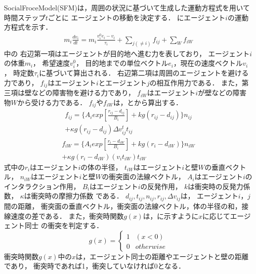 SocialFroceModel(SFM)は，周囲の状況に基づいて生成した運動方程式を用いて時間ステップ$t$ごとに
エージェントの移動を決定する．
にエージェント$i$の運動方程式を示す．
%
\begin{eqnarray}
  m_i \frac{dv_i}{dt} = m_i \frac{v_i^0 e_i - v_i}{\tau_i}
  +\sum_{j(\neq i)}f_{ij}+\sum_{W}f_{iW}
  \label{eq:sfm_siki1}
\end{eqnarray}
%
中の
右辺第一項はエージェントが目的地へ進む力を表しており，
エージェント$i$の体重$m_i$，
希望速度$v_i^0$，
目的地までの単位ベクトル$e_i$，現在の速度ベクトル$v_i$，
時定数$\tau_i$に基づいて算出される．
右辺第二項は周囲のエージェントを避ける力であり，
$f_{ij}$はエージェント$i$とエージェント$j$の相互作用力である．
また，第三項は壁などの障害物を避ける力であり，
$f_{iW}$はエージェント$i$が壁などの障害物$W$から受ける力である．
$f_{ij}$や$f_{iW}$は，とから算出する．
%
\begin{eqnarray}
  f_{ij} =  \{A_i exp [\frac{r_{ij} - d_{ij}}{B_i}  ]
  + kg(r_{ij} - d_{ij})\} n_{ij} \\ \nonumber
  + \kappa g (r_{ij} - d_{ij}) \Delta
  v^t_{ij} t_{ij}
  \label{eq:sfm_siki2}
\end{eqnarray}
%
\begin{eqnarray}
  f_{iW} = \{A_i exp[\frac{r_{i} - d_{iW}}{B_i}]
  + kg(r_{i} - d_{iW})\} n_{iW} \\ \nonumber
  + \kappa g (r_{i} - d_{iW}) (v_i t_{iW}) t_{iW}
  \label{eq:sfm_siki3}
\end{eqnarray}
%
式中の$r_i$はエージェント$i$の体の半径，
$t_{iW}$はエージェント$i$と壁$W$の垂直ベクトル，
$n_{iW}$はエージェント$i$と壁$W$の衝突面の法線ベクトル，
$A_i$はエージェント$i$のインタラクション作用，
$B_i$はエージェント$i$の反発作用，
$k$は衝突時の反発力係数，
$\kappa$は衝突時の摩擦力係数
である．
$d_{ij}, t_{ij}, n_{ij}, r_{ij}, \Delta v_{ij}$は，
エージェント$i$，$j$間の距離，
衝突面の垂直ベクトル，衝突面の法線ベクトル，体の半径の和，接線速度の差である．
また，衝突時関数$g(x)$は，に示すように$x$に応じてエージェント同士
の衝突を判定する．
%
\begin{equation}
  \label{eq:gx_siki}
  g(x) =
  \begin{cases}
    1 & (x<0)     \\
    0 & otherwise
  \end{cases}
\end{equation}
%
衝突時関数$g(x)$中の$x$は，エージェント同士の距離やエージェントと壁の距離であり，
衝突時であれば1，衝突していなければ0となる．
\fi



